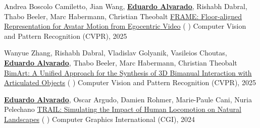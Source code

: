 \begin{cventries}
\cvpublication
    {Andrea Boscolo Camiletto, Jian Wang, \textbf{\underline{Eduardo Alvarado}}, Rishabh Dabral, Thabo Beeler, Marc Habermann, Christian Theobalt} %
    {\href{https://vcai.mpi-inf.mpg.de/projects/FRAME/} {FRAME: {Floor}-aligned {Representation} for {Avatar} {Motion} from {Egocentric} {Video}} (\href{https://github.com/abcamiletto/frame}{} \href{https://vcai.mpi-inf.mpg.de/projects/FRAME/}{} \href{https://vcai.mpi-inf.mpg.de/projects/FRAME/}{})} %
    {Computer Vision and Pattern Recognition (CVPR), 2025} %

\cvpublication
    {Wanyue Zhang, Rishabh Dabral, Vladislav Golyanik, Vasileios Choutas, \textbf{\underline{Eduardo Alvarado}}, Thabo Beeler, Marc Habermann, Christian Theobalt} %
    {\href{https://vcai.mpi-inf.mpg.de/projects/bimart/} {BimArt: A {Unified} {Approach} for the {Synthesis} of {3D} {Bimanual} {Interaction} with {Articulated} {Objects}} (\href{https://vcai.mpi-inf.mpg.de/projects/bimart/}{} \href{https://arxiv.org/pdf/2412.05066}{} \href{https://vcai.mpi-inf.mpg.de/projects/bimart/}{})} %
    {Computer Vision and Pattern Recognition (CVPR), 2025} %

\cvpublication
    {\textbf{\underline{Eduardo Alvarado}}, Oscar Argudo, Damien Rohmer, Marie-Paule Cani, Nuria Pelechano} %
    {\href{https://link.springer.com/article/10.1007/s00371-024-03506-z} {TRAIL: {Simulating} the {Impact} of {Human} {Locomotion} on {Natural} {Landscapes}} (\href{https://github.com/edualvarado/TRAIL-Natural-Impact}{} \href{https://link.springer.com/article/10.1007/s00371-024-03506-z}{} \href{https://link.springer.com/article/10.1007/s00371-024-03506-z}{})} %
    {Computer Graphics International (CGI), 2024} %



\end{cventries}
